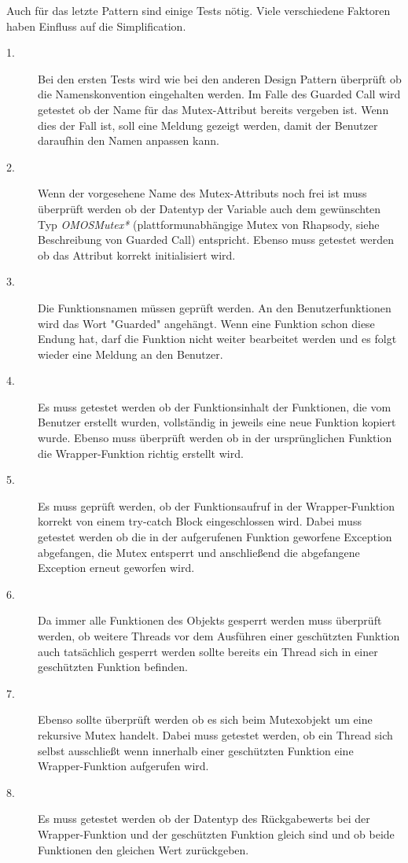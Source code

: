 Auch für das letzte Pattern sind einige Tests nötig. Viele verschiedene Faktoren
haben Einfluss auf die Simplification.
\begin{description}

	\item[1.]
	Bei den ersten Tests wird wie bei den anderen Design Pattern überprüft ob die Namenskonvention eingehalten werden. Im Falle des Guarded Call wird getestet ob der Name für das Mutex-Attribut bereits vergeben ist. Wenn dies der Fall ist, soll eine Meldung gezeigt werden, damit der Benutzer daraufhin den Namen anpassen kann.
	
	\item[2.]
	Wenn der vorgesehene Name des Mutex-Attributs noch frei ist muss überprüft werden ob der Datentyp der Variable auch dem gewünschten Typ \textit{OMOSMutex*} (plattformunabhängige Mutex von Rhapsody, siehe Beschreibung von Guarded Call) entspricht. Ebenso muss getestet werden ob das Attribut korrekt initialisiert wird.
	
	\item[3.]
	Die Funktionsnamen müssen geprüft werden. An den Benutzerfunktionen wird das Wort "Guarded" angehängt. Wenn eine Funktion schon diese Endung hat, darf die Funktion nicht weiter bearbeitet werden und es folgt wieder eine Meldung an den Benutzer.
	
	\item[4.]
	Es muss getestet werden ob der Funktionsinhalt der Funktionen, die vom Benutzer erstellt wurden, vollständig in jeweils eine neue Funktion kopiert wurde. Ebenso muss überprüft werden ob in der ursprünglichen Funktion die Wrapper-Funktion richtig erstellt wird.
	
	\item[5.]
	Es muss geprüft werden, ob der Funktionsaufruf in der Wrapper-Funktion korrekt von einem try-catch Block eingeschlossen wird. Dabei muss getestet werden ob die in der aufgerufenen Funktion geworfene Exception abgefangen, die Mutex entsperrt und anschließend die abgefangene Exception erneut geworfen wird.
	
	\item[6.]
	Da immer alle Funktionen des Objekts gesperrt werden muss überprüft werden, ob weitere Threads vor dem Ausführen einer geschützten Funktion auch tatsächlich gesperrt werden sollte bereits ein Thread sich in einer geschützten Funktion befinden.
	
	\item[7.]
	Ebenso sollte überprüft werden ob es sich beim Mutexobjekt um eine rekursive Mutex handelt. Dabei muss getestet werden, ob ein Thread sich selbst ausschließt wenn innerhalb einer geschützten Funktion eine Wrapper-Funktion aufgerufen wird.
	
	\item[8.]
	Es muss getestet werden ob der Datentyp des Rückgabewerts bei der Wrapper-Funktion und der geschützten Funktion gleich sind und ob beide Funktionen den gleichen Wert zurückgeben.
	
	
\end{description}
